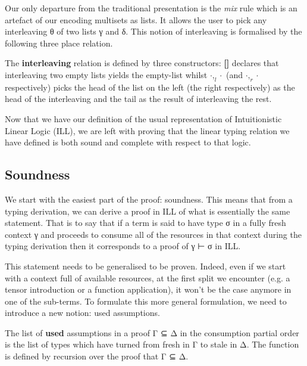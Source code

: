 

Our only departure from the traditional presentation is the \textit{mix}
rule which is an artefact of our encoding multisets as lists. It allows
the user to pick any interleaving θ of two lists γ and δ. This notion of
interleaving is formalised by the following three place relation.

\begin{definition} The \textbf{interleaving} relation is defined by three
constructors: \textbf{[]} declares that interleaving two empty lists yields
the empty-list whilst \textbf{$\cdot,_{l}\cdot$} (and \textbf{$\cdot,_{r}\cdot$}
respectively) picks the head of the list on the left (the right respectively)
as the head of the interleaving and the tail as the result of interleaving
the rest.

\end{definition}

Now that we have our definition of the usual representation of Intuitionistic
Linear Logic (ILL), we are left with proving that the linear typing relation
we have defined is both sound and complete with respect to that logic.

\subsection{Soundness}

We start with the easiest part of the proof: soundness. This means that from
a typing derivation, we can derive a proof in ILL of what is essentially the
same statement. That is to say that if a term is said to have type σ in a fully
fresh context γ and proceeds to consume all of the resources in that context
during the typing derivation then it corresponds to a proof of γ ⊢ σ in ILL.

This statement needs to be generalised to be proven. Indeed, even if we start
with a context full of available resources, at the first split we encounter
(e.g. a tensor introduction or a function application), it won't be the case
anymore in one of the sub-terms. To formulate this more general formulation,
we need to introduce a new notion: used assumptions.

\begin{definition}The list of \textbf{used} assumptions in a proof Γ ⊆ Δ in
the consumption partial order is the list of types which have turned from
fresh in Γ to stale in Δ. The \used{\cdot} function is defined by recursion
over the proof that Γ ⊆ Δ.
\end{definition}

